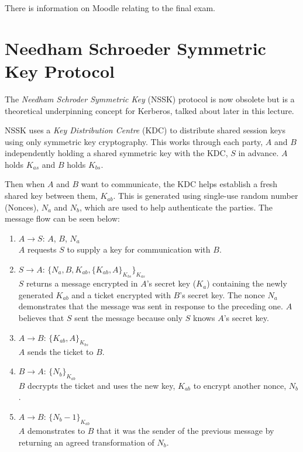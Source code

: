 
There is information on Moodle relating to the final exam.

\section{Needham Schroeder Symmetric Key Protocol}
The \textit{Needham Schroder Symmetric Key} (NSSK) protocol is now obsolete but is a theoretical underpinning concept for Kerberos, talked about later in this lecture.

NSSK uses a \textit{Key Distribution Centre} (KDC) to distribute shared session keys using only symmetric key cryptography. This works through each party, $A$ and $B$ independently holding a shared symmetric key with the KDC, $S$ in advance. $A$ holds $K_{as}$ and $B$ holds $K_{bs}$. 

Then when $A$ and $B$ want to communicate, the KDC helps establish a fresh shared key between them, $K_{ab}$. This is generated using single-use random number (Nonces), $N_a$ and $N_b$, which are used to help authenticate the parties. The message flow can be seen below:

\begin{enumerate}
    \item $A \rightarrow S$: $A$, $B$, $N_a$\\
    $A$ requests $S$ to supply a key for communication with $B$.
    \item $S \rightarrow A$: $\{N_a, B, K_{ab}, \{K_{ab}, A\}_{K_{bs}}\}_{K_{as}}$\\
    $S$ returns a message encrypted in $A$'s secret key ($K_a$) containing the newly generated $K_{ab}$ and a ticket encrypted with $B$'s secret key. The nonce $N_a$ demonstrates that the message was sent in response to the preceding one. $A$ believes that $S$ sent the message because only $S$ knows $A$'s secret key.
    \item $A \rightarrow B$: $\{K_{ab}, A\}_{K_{bs}}$\\
    $A$ sends the ticket to $B$.
    \item $B \rightarrow A$: $\{N_b\}_{K_{ab}}$\\
    $B$ decrypts the ticket and uses the new key, $K_{ab}$ to encrypt another nonce, $N_b$. 
    \item $A \rightarrow B$: $\{N_b - 1\}_{K_{ab}}$\\
    $A$ demonstrates to $B$ that it was the sender of the previous message by returning an agreed transformation of $N_b$. 
\end{enumerate}

